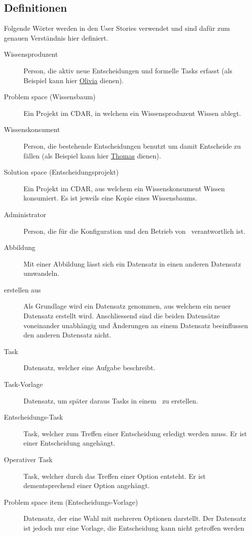 	\subsection{Definitionen}\label{userstoryDefinitions}
		Folgende Wörter werden in den User Stories verwendet und sind dafür zum genauen Verständnis hier definiert.
		\begin{description}
			\item[Wissensproduzent] Person, die aktiv neue Entscheidungen und formelle Tasks erfasst (als Beispiel kann hier \hyperref[olivia]{Olivia} dienen).
			\item[Problem space (Wissensbaum)] Ein Projekt im CDAR, in welchem ein Wissensproduzent Wissen ablegt.
			\item[Wissenskonsument] Person, die bestehende Entscheidungen benutzt um damit Entscheide zu fällen (als Beispiel kann hier \hyperref[thomas]{Thomas} dienen).
			\item[Solution space (Entscheidungsprojekt)] Ein Projekt im CDAR, aus welchem ein Wissenskonsument Wissen konsumiert.
				Es ist jeweils eine Kopie eines Wissensbaums.
			\item[Administrator] Person, die für die Konfiguration und den Betrieb von \eeppi\ verantwortlich ist.
			\item[Abbildung] Mit einer Abbildung lässt sich ein Datensatz in einen anderen Datensatz umwandeln.
			\item[erstellen aus] Als Grundlage wird ein Datensatz genommen, aus welchem ein neuer Datensatz erstellt wird.
				Anschliessend sind die beiden Datensätze voneinander unabhängig und Änderungen an einem Datensatz beeinflussen den anderen Datensatz nicht.
			\item[Task] Datensatz, welcher eine Aufgabe beschreibt.
			\item[Task-Vorlage] Datensatz, um später daraus Tasks in einem \ppt\ zu erstellen.
			\item[Entscheidungs-Task] Task, welcher zum Treffen einer Entscheidung erledigt werden muss.
				Er ist einer Entscheidung angehängt.
			\item[Operativer Task] Task, welcher durch das Treffen einer Option entsteht.
				Er ist dementsprechend einer Option angehängt.
			\item[Problem space item (Entscheidungs-Vorlage)] Datensatz, der eine Wahl mit mehreren Optionen darstellt.
				Der Datensatz ist jedoch nur eine Vorlage, die Entscheidung kann nicht getroffen werden

\end{description}
